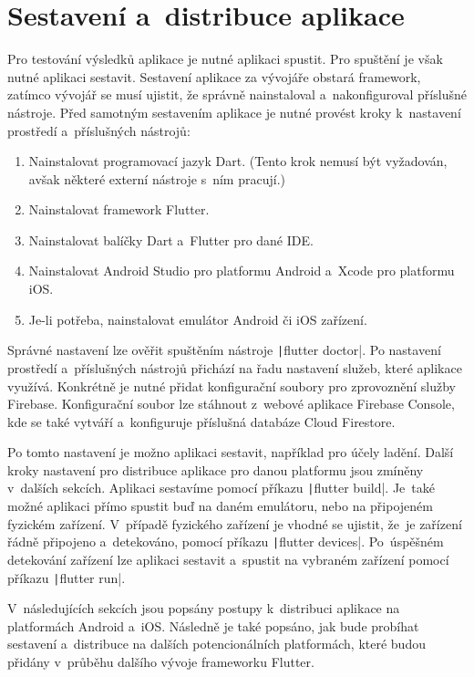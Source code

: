 \chapter{Sestavení a~distribuce aplikace}
\label{chap:deployment}

Pro testování výsledků aplikace je nutné aplikaci spustit.
Pro spuštění je však nutné aplikaci sestavit.
Sestavení aplikace za vývojáře obstará framework,
zatímco vývojář se musí ujistit,
že správně nainstaloval a~nakonfiguroval příslušné nástroje.
Před samotným sestavením aplikace je nutné provést kroky k~nastavení prostředí
a~příslušných nástrojů:

\begin{enumerate}
    \item Nainstalovat programovací jazyk Dart.
    (Tento krok nemusí být vyžadován,
    avšak některé externí nástroje s~ním pracují.)
    \item Nainstalovat framework Flutter.
    \item Nainstalovat balíčky Dart a~Flutter pro dané IDE.
    \item Nainstalovat Android Studio pro platformu Android
    a~Xcode pro platformu iOS.
    \item Je-li potřeba, nainstalovat emulátor Android či iOS zařízení.
\end{enumerate}

Správné nastavení lze ověřit spuštěním nástroje
\texttt|flutter doctor|.
Po nastavení prostředí a~příslušných nástrojů přichází na řadu nastavení služeb,
které aplikace využívá.
Konkrétně je nutné přidat konfigurační soubory pro zprovoznění služby Firebase.
Konfigurační soubor lze stáhnout z~webové aplikace Firebase Console,
kde se také vytváří a~konfiguruje příslušná databáze Cloud Firestore. 

Po tomto nastavení je možno aplikaci sestavit,
například pro účely ladění.
Další kroky nastavení pro distribuce aplikace pro danou platformu jsou
zmíněny v~dalších sekcích.
Aplikaci sestavíme pomocí příkazu \texttt|flutter build|.
Je~také možné aplikaci přímo spustit buď na daném emulátoru,
nebo na připojeném fyzickém zařízení.
V~případě fyzického zařízení je vhodné se ujistit,
že~je zařízení řádně připojeno a~detekováno,
pomocí příkazu \texttt|flutter devices|.
Po~úspěšném detekování zařízení lze aplikaci sestavit a~spustit na vybraném
zařízení pomocí příkazu \texttt|flutter run|. 

V~následujících sekcích jsou popsány postupy k~distribuci aplikace na
platformách Android a~iOS.
Následně je také popsáno,
jak bude probíhat sestavení a~distribuce na dalších potencionálních
platformách,
které budou přidány v~průběhu dalšího vývoje frameworku Flutter.




